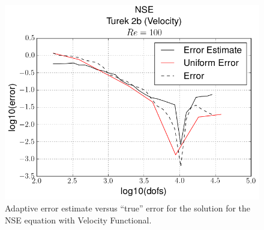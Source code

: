 \begin{test}
    \begin{figure}[h]
        \centering
        \includegraphics[scale=0.5]{Figures/AdaptiveNSEVelocityRe100.png}
        \caption{Adaptive error estimate versus ``true'' error for the solution
            for the NSE equation with Velocity Functional.}
        \label{fig:NSEVelocity_err}
    \end{figure}

\end{test}

